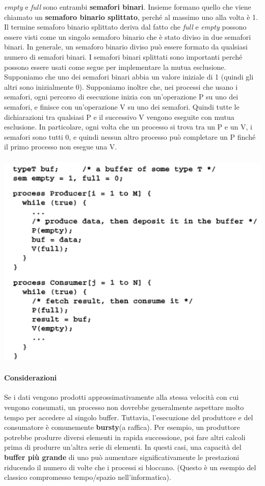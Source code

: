 \documentclass[10pt,a4paper]{article}
\begin{document}
\textit{empty} e \textit{full} sono entrambi \textbf{semafori binari}. Insieme
formano quello che viene chiamato un \textbf{semaforo binario splittato}, perché al massimo uno alla volta è 1. Il termine semaforo binario splittato deriva dal fatto che \textit{full} e \textit{empty} possono essere visti come un singolo semaforo binario che è stato diviso in due semafori binari. In generale, un semaforo binario diviso può essere formato da qualsiasi numero di semafori binari.
I semafori binari splittati sono importanti perché possono essere usati come segue per implementare la mutua esclusione. Supponiamo che uno dei semafori binari abbia un valore iniziale di 1 (quindi gli altri sono inizialmente 0). Supponiamo inoltre che, nei processi che usano i semafori, ogni percorso di esecuzione inizia con un'operazione P su uno dei semafori, e finisce con un'operazione V su uno dei semafori.
Quindi tutte le dichiarazioni tra qualsiasi P e il successivo V vengono eseguite con mutua esclusione.
In particolare, ogni volta che un processo si trova tra un P e un V, i semafori sono tutti 0, e quindi nessun altro processo può completare un P finché il primo processo non esegue una V.\\ \\
\includegraphics[scale=0.7]{img/split.png} \\

\paragraph{Considerazioni} Se i dati vengono prodotti approssimativamente alla stessa velocità con cui vengono consumati, un processo non dovrebbe generalmente aspettare molto tempo per accedere al singolo buffer. Tuttavia, l'esecuzione del produttore e del consumatore è comunemente \textbf{bursty}(a raffica).
Per esempio, un produttore potrebbe produrre diversi elementi in rapida successione, poi fare altri calcoli prima di produrre un'altra serie di elementi. In questi casi, una capacità del \textbf{buffer più grande} di uno può aumentare significativamente le prestazioni riducendo il numero di volte che i processi si bloccano. (Questo è un esempio del classico compromesso tempo/spazio nell'informatica).
\end{document}
